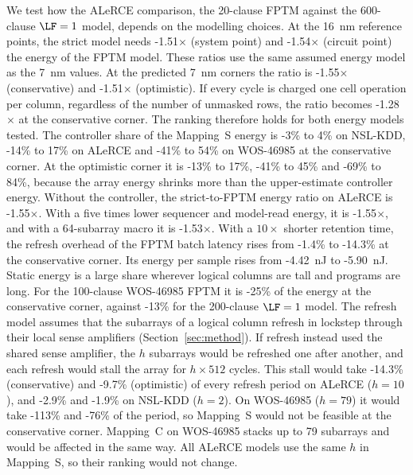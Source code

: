 We test how the  ALeRCE comparison, the 20-clause FPTM against the 600-clause $\LF=1$ model, depends on the modelling choices.
At the 16~nm reference points, the strict model needs \hyp{1.51$\times$} (system point) and \hyp{1.54$\times$} (circuit point) the energy of the FPTM model. These ratios use the same assumed energy model as the 7~nm values.
At the predicted 7~nm corners the ratio is \hyp{1.55$\times$} (conservative) and \hyp{1.51$\times$} (optimistic).
If every cycle is charged one cell operation per column, regardless of the number of unmasked rows, the ratio becomes \hyp{1.28$\times$} at the conservative corner.
The ranking therefore holds for both energy models tested.
The controller share of the Mapping~S energy is \hyp{3\% to 4\%} on NSL-KDD, \hyp{14\% to 17\%} on ALeRCE and \hyp{41\% to 54\%} on WOS-46985 at the conservative corner. At the optimistic corner it is \hyp{13\% to 17\%}, \hyp{41\% to 45\%} and \hyp{69\% to 84\%}, because the array energy shrinks more than the upper-estimate controller energy. Without the controller, the strict-to-FPTM energy ratio on ALeRCE is \hyp{1.55$\times$}. With a five times lower sequencer and model-read energy, it is \hyp{1.55$\times$}, and with a 64-subarray macro it is \hyp{1.53$\times$}.
With a $10\times$ shorter retention time, the refresh overhead of the FPTM batch latency rises from \hyp{1.4\%} to \hyp{14.3\%} at the conservative corner. Its energy per sample rises from \hyp{4.42~nJ} to \hyp{5.90~nJ}.
Static energy is a large share wherever logical columns are tall and programs are long. For the 100-clause WOS-46985 FPTM it is \hyp{25\%} of the energy at the conservative corner, against \hyp{13\%} for the 200-clause $\LF=1$ model.
The refresh model assumes that the subarrays of a logical column refresh in lockstep through their local sense amplifiers (Section~\ref{sec:method}). If refresh instead used the shared sense amplifier, the $h$ subarrays would be refreshed one after another, and each refresh would stall the array for $h\times512$ cycles. This stall would take \hyp{14.3\%} (conservative) and \hyp{9.7\%} (optimistic) of every refresh period on ALeRCE ($h=10$), and \hyp{2.9\%} and \hyp{1.9\%} on NSL-KDD ($h=2$). On WOS-46985 ($h=79$) it would take \hyp{113\%} and \hyp{76\%} of the period, so Mapping~S would not be feasible at the conservative corner. Mapping~C on WOS-46985 stacks up to 79 subarrays and would be affected in the same way. All ALeRCE models use the same $h$ in Mapping~S, so their ranking would not change.
